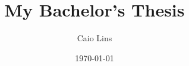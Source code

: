 \usepackage{academic-dissertation}
\usepackage{global-macros}

\title{My Bachelor's Thesis}
\author{Caio Lins}
\date{\today}

